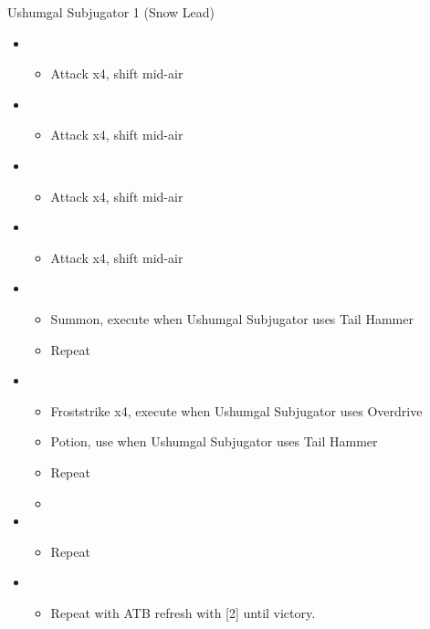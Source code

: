 \documentclass{report}
\begin{document}
\begin{battle}{Ushumgal Subjugator 1 (Snow Lead)}
\begin{itemize}
    \item \first
    \begin{itemize}
        \item Attack x4, shift mid-air
    \end{itemize}
    \item \second
    \begin{itemize}
        \item Attack x4, shift mid-air
    \end{itemize}
    \item \first
    \begin{itemize}
        \item Attack x4, shift mid-air
    \end{itemize}
    \item \second
    \begin{itemize}
        \item Attack x4, shift mid-air
    \end{itemize}
    \item \first
    \begin{itemize}
        \item Summon, execute when Ushumgal Subjugator uses Tail Hammer
        \item Repeat
     \end{itemize}
    \item \fifth
    \begin{itemize}
        \item Froststrike x4, execute when Ushumgal Subjugator uses Overdrive
        \item Potion, use when Ushumgal Subjugator uses Tail Hammer
        \item Repeat
        \item \stagger
    \end{itemize}
    \item \sixth
    \begin{itemize}
        \item Repeat
    \end{itemize}
    \item \first
    \begin{itemize}
        \item Repeat with ATB refresh with [2] until victory.
    \end{itemize}
\end{itemize}
\end{battle}
\end{document}
